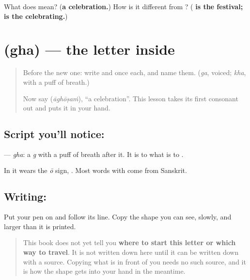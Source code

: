 \begin{tcolorbox}[breakable,colback=teal!4,colframe=teal!35!black,title={Before you move on}]
What does \textbf{} mean? (\textbf{a celebration.}) How is it different from \textbf{}? (\textbf{ is the festival;  is the celebrating.})
\end{tcolorbox}
\section[\texorpdfstring{\ml{ഘ} (gha)}{ഘ (gha)}]{ (gha) — the letter inside }

\label{lesson:ML-W348-gha}



\begin{quote}
Before the new one: write \textbf{} and \textbf{} once each, and name them. (\emph{ga}, voiced; \emph{kha}, with a puff of breath.)

Now say \textbf{} (\emph{āghōṣaṁ}), \textquotedblleft{}a celebration\textquotedblright{}. This lesson takes its first consonant out and puts it in your hand.
\end{quote}

\subsection*{Script you'll notice: }
\textbf{} — \emph{gha}: a \emph{g} with a puff of breath after it. It is to \textbf{} what \textbf{} is to \textbf{}.

In \textbf{} it wears the \emph{ō} sign, \textbf{}. Most words with \textbf{} come from Sanskrit.

\subsection*{Writing: }
Put your pen on \textbf{} and follow its line. Copy the shape you can see, slowly, and larger than it is printed.

\begin{quote}
This book does not yet tell you \textbf{where to start this letter or which way to travel}. It is not written down here until it can be written down with a source. Copying what is in front of you needs no such source, and it is how the shape gets into your hand in the meantime.
\end{quote}

